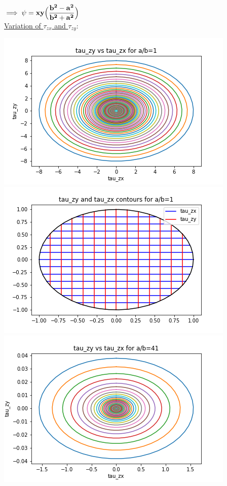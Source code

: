 \documentclass{article}
\begin{document}
\noindent $\implies \mathbf{\psi=xy\Big{(}\dfrac{b^2-a^2}{b^2+a^2}\Big{)}}$\\


\noindent \underline{Variation of $\tau_{zx}$ and $\tau_{zy}$}:\\

\begin{center}

\includegraphics[scale=1]{AE238_A3_1.png}\\
\newpage
\includegraphics[scale=1]{AE238_A3_3.png}\\
\bigbreak
\includegraphics[scale=1]{AE238_A3_2.png}\\


\end{center}
\end{document}
